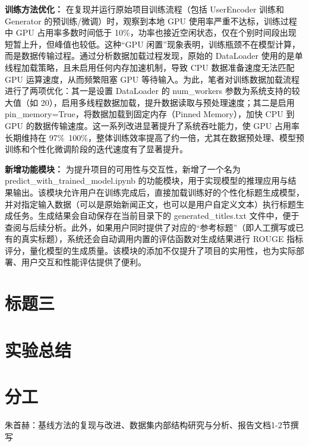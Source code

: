 \documentclass[10pt,a4paper]{article}
\begin{document}
\textbf{训练方法优化：}
在复现并运行原始项目训练流程（包括 UserEncoder 训练和 Generator 的预训练/微调）时，观察到本地 GPU 使用率严重不达标，训练过程中 GPU 占用率多数时间低于 10\%，功率也接近空闲状态，仅在个别时间段出现短暂上升，但峰值也较低。这种“GPU 闲置”现象表明，训练瓶颈不在模型计算，而是数据传输过程。通过分析数据加载过程发现，原始的 DataLoader 使用的是单线程加载策略，且未启用任何内存加速机制，导致 CPU 数据准备速度无法匹配 GPU 运算速度，从而频繁阻塞 GPU 等待输入。为此，笔者对训练数据加载流程进行了两项优化：其一是设置 DataLoader 的 num\_workers 参数为系统支持的较大值（如 20），启用多线程数据加载，提升数据读取与预处理速度；其二是启用 pin\_memory=True，将数据加载到固定内存（Pinned Memory），加快 CPU 到 GPU 的数据传输速度。这一系列改进显著提升了系统吞吐能力，使 GPU 占用率长期维持在 97\%~100\%，整体训练效率提高了约一倍，尤其在数据预处理、模型预训练和个性化微调阶段的迭代速度有了显著提升。

\textbf{新增功能模块：}
为提升项目的可用性与交互性，新增了一个名为 predict\_with\_trained\_model.ipynb 的功能模块，用于实现模型的推理应用与结果输出。该模块允许用户在训练完成后，直接加载训练好的个性化标题生成模型，并对指定输入数据（可以是原始新闻正文，也可以是用户自定义文本）执行标题生成任务。生成结果会自动保存在当前目录下的 generated\_titles.txt 文件中，便于查阅与后续分析。此外，如果用户同时提供了对应的“参考标题”（即人工撰写或已有的真实标题），系统还会自动调用内置的评估函数对生成结果进行 ROUGE 指标评分，量化模型的生成质量。该模块的添加不仅提升了项目的实用性，也为实际部署、用户交互和性能评估提供了便利。

\section{标题三}

\section{实验总结}

\section{分工}
朱首赫：基线方法的复现与改进、数据集内部结构研究与分析、报告文档1-2节撰写
\end{document}
